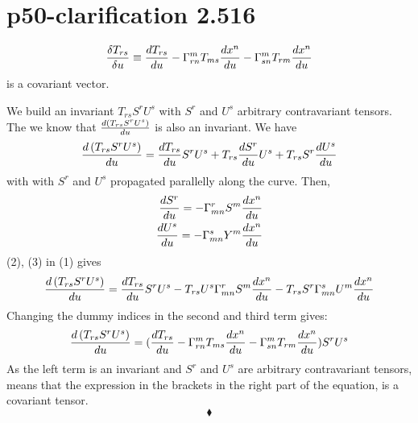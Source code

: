 \section{p50-clarification 2.516}
\begin{tcolorbox}
$$\frac{\delta T_{rs}}{\delta u} \equiv \dv{T_{rs}}{u}  - \Gamma^m_{rn}T_{ms}\dv{x^n}{u} - \Gamma^m_{sn}T_{rm}\dv{x^n}{u}$$ is a covariant vector.
\end{tcolorbox}
We build an invariant $ T_{rs} S^rU^s$ with $S^r$ and $U^s$ arbitrary contravariant tensors. The we know that $\dv{\left( T_{rs} S^r U^s\right)}{u}$ is also an invariant. We have 
\begin{align}
\dv{\left( T_{rs} S^r U^s\right)}{u} = \dv{T_{rs}}{u} S^r U^s + T_{rs} \dv{S^r}{u} U^s + T_{rs} S^r \dv{U^s}{u}
\end{align} 
with with $S^r$ and $U^s$ propagated parallelly along the curve. Then,
\begin{align}
\dv{S^r}{u} = - \Gamma^r_{mn}S^m\dv{x^n}{u}\\
\dv{U^s}{u} = - \Gamma^s_{mn}Y^m\dv{x^n}{u}
\end{align} 
(2), (3) in (1) gives 
\begin{align}
\dv{\left( T_{rs} S^r U^s\right)}{u} = \dv{T_{rs}}{u} S^r U^s - T_{rs}U^s\Gamma^r_{mn}S^m\dv{x^n}{u} - T_{rs} S^r \Gamma^s_{mn}U^m\dv{x^n}{u}
\end{align} 
Changing the dummy indices in the second and third term gives:
\begin{align}
\dv{\left( T_{rs} S^r U^s\right)}{u} = (\dv{T_{rs}}{u}  - \Gamma^m_{rn}T_{ms}\dv{x^n}{u} - \Gamma^m_{sn}T_{rm}\dv{x^n}{u})S^r U^s
\end{align} 
As the left term is an invariant and $S^r$ and $U^s$ are arbitrary contravariant tensors, means that the expression in the brackets in the right part of the equation, is a covariant tensor.
$$\blacklozenge$$
\newpage

